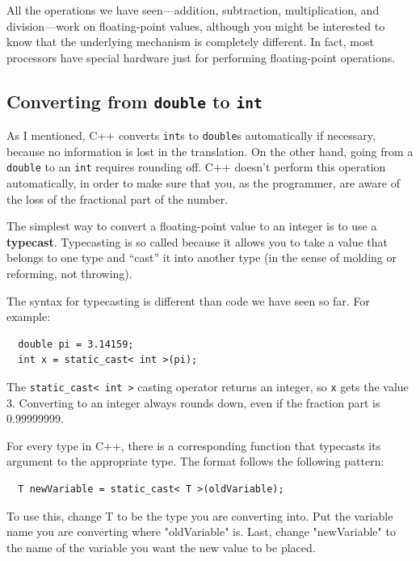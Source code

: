 
All the operations we have seen---addition, subtraction,
multiplication, and division---work on floating-point values,
although you might be interested to know that the underlying mechanism
is completely different.  In fact, most processors have special
hardware just for performing floating-point operations.

\subsection{Converting from {\tt double} to {\tt int}}
\label{rounding}

As I mentioned, C++ converts {\tt int}s
to {\tt double}s automatically if necessary, because no
information is lost in the translation.  On the other hand,
going from a {\tt double} to an {\tt int} requires rounding
off.  C++ doesn't perform this operation automatically, in
order to make sure that you, as the programmer, are aware
of the loss of the fractional part of the number.

The simplest way to convert a floating-point value to an integer is to
use a {\bf typecast}.  Typecasting is so called because it allows you
to take a value that belongs to one type and ``cast'' it into another
type (in the sense of molding or reforming, not throwing).

The syntax for typecasting is different than code we have seen so far.  For example:

\begin{lstlisting}
  double pi = 3.14159;
  int x = static_cast< int >(pi);
\end{lstlisting}
%
The {\tt static\_cast< int >} casting operator returns an integer, so {\tt x} gets the value
3.  Converting to an integer always rounds down, even if the fraction
part is 0.99999999.

For every type in C++, there is a corresponding function that
typecasts its argument to the appropriate type. The format follows the following pattern:

\begin{lstlisting}
  T newVariable = static_cast< T >(oldVariable);
\end{lstlisting}
To use this, change T to be the type you are converting into. Put the variable name you are converting where "oldVariable" is. Last, change "newVariable" to the name of the variable you want the new value to be placed. 


